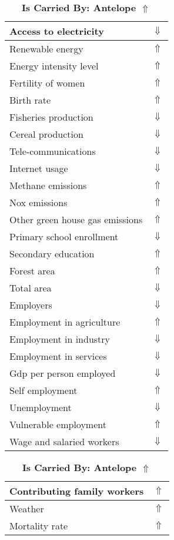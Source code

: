 \documentclass[12pt,notitlepage,oneside]{report}
\begin{document}
\begin{table}[!htb]
\caption{\textbf{Is Carried By: Antelope $\Uparrow$}}
\centering
\label{Correlated Socio-economic Factors0}
\begin{tabular}{|l|l|}
\hline
Access to electricity & $\Downarrow$\\ \hline
Renewable energy & $\Uparrow$\\ \hline
Energy intensity level & $\Uparrow$\\ \hline
Fertility of women & $\Uparrow$\\ \hline
Birth rate & $\Uparrow$\\ \hline
Fisheries production & $\Downarrow$\\ \hline
Cereal production & $\Downarrow$\\ \hline
Tele-communications & $\Downarrow$\\ \hline
Internet usage & $\Downarrow$\\ \hline
Methane emissions & $\Uparrow$\\ \hline
Nox emissions & $\Uparrow$\\ \hline
Other green house gas emissions & $\Uparrow$\\ \hline
Primary school enrollment & $\Downarrow$\\ \hline
Secondary education & $\Uparrow$\\ \hline
Forest area & $\Uparrow$\\ \hline
Total area & $\Downarrow$\\ \hline
Employers & $\Downarrow$\\ \hline
Employment in agriculture & $\Uparrow$\\ \hline
Employment in industry & $\Downarrow$\\ \hline
Employment in services & $\Downarrow$\\ \hline
Gdp per person employed & $\Downarrow$\\ \hline
Self employment & $\Uparrow$\\ \hline
Unemployment & $\Downarrow$\\ \hline
Vulnerable employment & $\Uparrow$\\ \hline
Wage and salaried workers & $\Downarrow$\\ \hline
\end{tabular}
\begin{tabular}{|l|l|}
\hline
Contributing family workers & $\Uparrow$\\ \hline
Weather & $\Uparrow$\\ \hline
Mortality rate & $\Uparrow$\\ \hline

\end{tabular}
\end{table}
\end{document}
